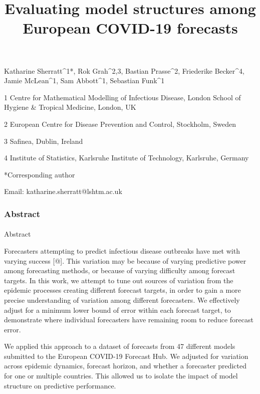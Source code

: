 \documentclass[
  letterpaper,
  DIV=11,
  numbers=noendperiod]{scrartcl}
\title{Evaluating model structures among European COVID-19 forecasts}
\author{}
\date{}
\makeatletter
\let\oldparagraph\paragraph
\renewcommand{\paragraph}{
    \@ifstar
      \xxxParagraphStar
      \xxxParagraphNoStar
  }
\newcommand{\xxxParagraphStar}[1]{\oldparagraph*{#1}\mbox{}}
\newcommand{\xxxParagraphNoStar}[1]{\oldparagraph{#1}\mbox{}}
\makeatother
\begin{document}
\maketitle


Katharine Sherratt\^{}1*, Rok Grah\^{}2,3, Bastian Prasse\^{}2,
Friederike Becker\^{}4, Jamie McLean\^{}1, Sam Abbott\^{}1, Sebastian
Funk\^{}1

1 Centre for Mathematical Modelling of Infectious Disease, London School
of Hygiene \& Tropical Medicine, London, UK

2 European Centre for Disease Prevention and Control, Stockholm, Sweden

3 Safinea, Dublin, Ireland

4 Institute of Statistics, Karlsruhe Institute of Technology, Karlsruhe,
Germany

*Corresponding author

Email: katharine.sherratt@lshtm.ac.uk

\subsubsection{Abstract}\label{abstract}

\paragraph{Abstract}\label{abstract-1}

Forecasters attempting to predict infectious disease outbreaks have met
with varying success {[}@{]}. This variation may be because of varying
predictive power among forecasting methods, or because of varying
difficulty among forecast targets. In this work, we attempt to tune out
sources of variation from the epidemic processes creating different
forecast targets, in order to gain a more precise understanding of
variation among different forecasters. We effectively adjust for a
minimum lower bound of error within each forecast target, to demonstrate
where individual forecasters have remaining room to reduce forecast
error.

We applied this approach to a dataset of forecasts from 47 different
models submitted to the European COVID-19 Forecast Hub. We adjusted for
variation across epidemic dynamics, forecast horizon, and whether a
forecaster predicted for one or multiple countries. This allowed us to
isolate the impact of model structure on predictive performance.
\end{document}
